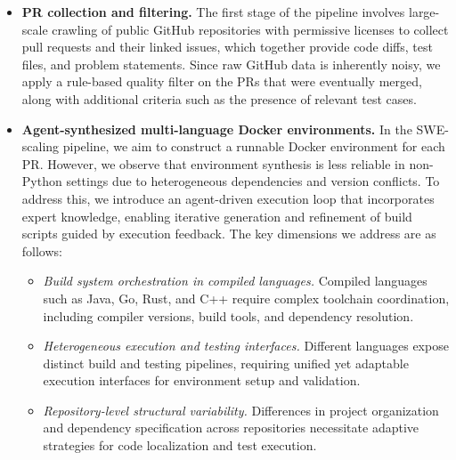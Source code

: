 \begin{itemize}
    \item \textbf{PR collection and filtering.} The first stage of the pipeline involves large-scale crawling of public GitHub repositories with permissive licenses to collect pull requests and their linked issues, which together provide code diffs, test files, and problem statements. Since raw GitHub data is inherently noisy, we apply a rule-based quality filter on the PRs that were eventually merged, along with additional criteria such as the presence of relevant test cases.

    \item \textbf{Agent-synthesized multi-language Docker environments.} In the SWE-scaling pipeline, we aim to construct a runnable Docker environment for each PR.
    However, we observe that environment synthesis is less reliable in non-Python settings due to heterogeneous dependencies and version conflicts. To address this, we introduce an agent-driven execution loop that incorporates expert knowledge, enabling iterative generation and refinement of build scripts guided by execution feedback. The key dimensions we address are as follows:

    \begin{itemize}
        \item \textit{Build system orchestration in compiled languages.} Compiled languages such as Java, Go, Rust, and C++ require complex toolchain coordination, including compiler versions, build tools, and dependency resolution.
    
        \item \textit{Heterogeneous execution and testing interfaces.} Different languages expose distinct build and testing pipelines, requiring unified yet adaptable execution interfaces for environment setup and validation.
    
        \item \textit{Repository-level structural variability.} Differences in project organization and dependency specification across repositories necessitate adaptive strategies for code localization and test execution.
    \end{itemize}



\end{itemize}
